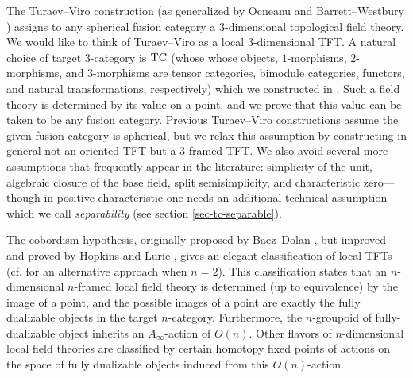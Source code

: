 \documentclass{amsart}
\begin{document}
The Turaev--Viro \cite{MR1191386, MR1292673} construction (as generalized by Ocneanu \cite{MR1317353} and Barrett--Westbury \cite{MR1686423}) assigns to any spherical fusion category a 3-dimensional topological field theory.   We would like to think of Turaev--Viro as a local $3$-dimensional TFT.  A natural choice of target $3$-category is $\mathrm{TC}$ (whose whose objects, $1$-morphisms, $2$-morphisms, and $3$-morphisms are tensor categories, bimodule categories, functors, and natural transformations, respectively) which we constructed in \cite{3TC}.  Such a field theory is determined by its value on a point, and we prove that this value can be taken to be any fusion category.  Previous Turaev--Viro constructions assume the given fusion category is spherical, but we relax this assumption by constructing in general not an oriented TFT but a $3$-framed TFT. %
We also avoid several more assumptions that frequently appear in the literature: simplicity of the unit, algebraic closure of the base field, split semisimplicity, and characteristic zero---though in positive characteristic one needs an additional technical assumption which we call {\em separability} (see section \ref{sec-tc-separable}).

The cobordism hypothesis, originally proposed by Baez--Dolan \cite{MR1355899}, but improved and proved by Hopkins and Lurie \cite{0905.0465}, gives an elegant classification of local TFTs (cf. \cite{schommer-pries-thesis} for an alternative approach when $n=2$).  This classification states that an $n$-dimensional $n$-framed local field theory is determined (up to equivalence) by the image of a point, and the possible images of a point are exactly the fully dualizable objects in the target $n$-category.  Furthermore, the $n$-groupoid of fully-dualizable object inherits an $A_\infty$-action of $O(n)$. Other flavors of $n$-dimensional local field theories are classified by certain homotopy fixed points of actions %
on the space of fully dualizable objects induced from this $O(n)$-action. 
\end{document}
